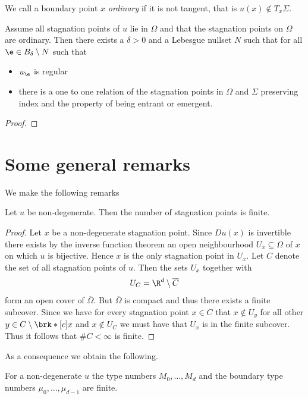 We call a boundary point $x$ \emph{ordinary} if it is not tangent, that is $u(x)\not\in T_x\Sigma$.
\begin{proposition}
  Assume all stagnation points of $u$ lie in $\Omega$ and that the stagnation points on $\Omega$ are
  ordinary. Then there exists a $\delta>0$ and a Lebesgue nullset $N$ such that
  for all $\e\in B_\delta\setminus N$ such that
  \begin{itemize}
    \item $u_\e$ is regular
    \item there is a one to one relation of the stagnation points in $\Omega$ and $\Sigma$ preserving
      index and the property of being entrant or emergent.
  \end{itemize}
\end{proposition}
\begin{proof}
\end{proof}

\section{Some general remarks}

We make the following remarks
\begin{proposition}
  Let $u$ be non-degenerate. Then the number of
  stagnation points is finite.
\end{proposition}
\begin{proof}
Let $x$ be a non-degenerate stagnation point. Since $Du(x)$ is invertible there exists
by the inverse function theorem an open neighbourhood $U_x\subseteq\Omega$ of $x$ on which 
$u$ is bijective. Hence $x$ is the only stagnation point in $U_x$. Let $C$ denote the set of all
stagnation points of $u$. Then the sets $U_x$ together with
\begin{align}
  U_C=\R^d\setminus \overline{C}
\end{align}
form an open cover of $\overline{\Omega}$. But $\overline{\Omega}$ is compact and thus there exists
a finite subcover. Since we have for every stagnation point $x\in C$ that
$x\not\in U_y$ for all other $y\in C\setminus\brk*[c]{x}$ and $x\not\in U_C$ we must have that $U_x$
is in the finite subcover. Thus it follows that $\#C<\infty$ is finite.
\end{proof}
As a consequence we obtain the following.
\begin{corollary}
  For a non-degenerate $u$ the type numbers $M_0,\dots,M_d$ and the boundary type numbers $\mu_0,\dots,\mu_{d-1}$
  are finite.
\end{corollary}

